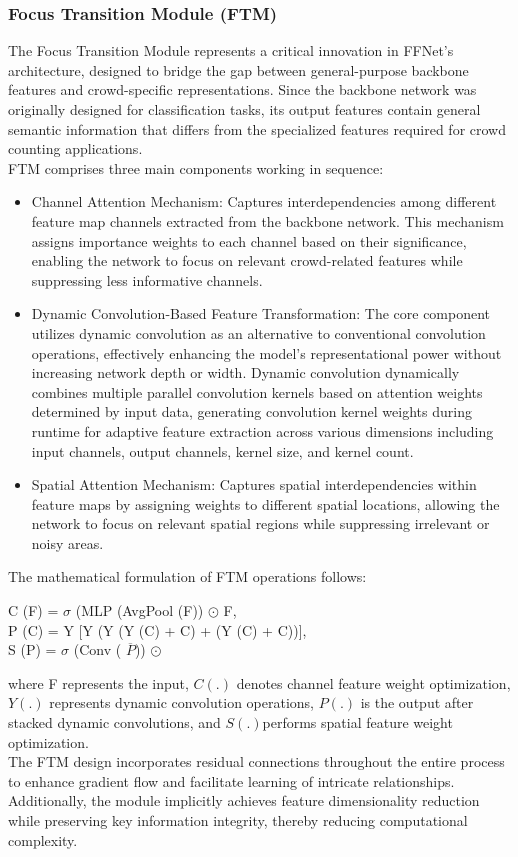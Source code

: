 \subsubsection{Focus Transition Module (FTM)}
The Focus Transition Module represents a critical innovation in FFNet's architecture, designed to bridge the gap between general-purpose backbone features and crowd-specific representations. Since the backbone network was originally designed for classification tasks, its output features contain general semantic information that differs from the specialized features required for crowd counting applications.\\
FTM comprises three main components working in sequence:
\begin{itemize}
    \item Channel Attention Mechanism: Captures interdependencies among different feature map channels extracted from the backbone network. This mechanism assigns importance weights to each channel based on their significance, enabling the network to focus on relevant crowd-related features while suppressing less informative channels.
    \item Dynamic Convolution-Based Feature Transformation: The core component utilizes dynamic convolution as an alternative to conventional convolution operations, effectively enhancing the model's representational power without increasing network depth or width. Dynamic convolution dynamically combines multiple parallel convolution kernels based on attention weights determined by input data, generating convolution kernel weights during runtime for adaptive feature extraction across various dimensions including input channels, output channels, kernel size, and kernel count.
    \item Spatial Attention Mechanism: Captures spatial interdependencies within feature maps by assigning weights to different spatial locations, allowing the network to focus on relevant spatial regions while suppressing irrelevant or noisy areas.
\end{itemize}
The mathematical formulation of FTM operations follows:
\begin{center}
    C (F) = $ \sigma $ (MLP (AvgPool (F)) $ \odot $ F, \\ P (C) = Y [Y (Y (Y (C) + C) + (Y (C) + C))], \\ S (P) = $ \sigma $ (Conv ( $ \overline {P} $)) $ \odot $
\end{center}
where F represents the input, $C(.)$ denotes channel feature weight optimization, $Y(.)$ represents dynamic convolution operations, $P(.)$ is the output after stacked dynamic convolutions, and $S(.) $performs spatial feature weight optimization.\\
The FTM design incorporates residual connections throughout the entire process to enhance gradient flow and facilitate learning of intricate relationships. Additionally, the module implicitly achieves feature dimensionality reduction while preserving key information integrity, thereby reducing computational complexity.
